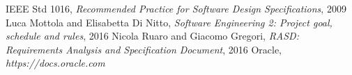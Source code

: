 	IEEE Std 1016, \emph{Recommended Practice for Software Design Specifications}, 2009
	Luca Mottola and Elisabetta Di Nitto, \emph{Software Engineering 2: Project goal, schedule and rules}, 2016
	Nicola Ruaro and Giacomo Gregori, \emph{RASD: Requirements Analysis and Specification Document}, 2016	
	Oracle, \emph{https://docs.oracle.com}